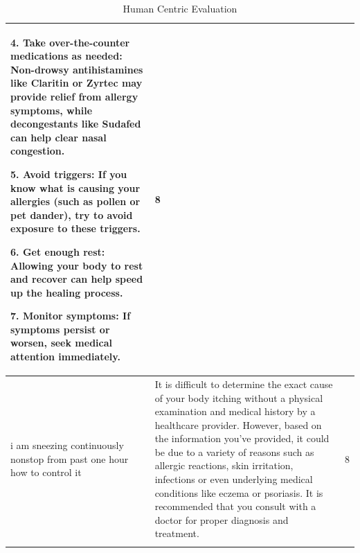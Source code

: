 \begin{longtable}{|p{3.5cm}|p{9.1cm}|c|}
                4. Take over-the-counter medications as needed: Non-drowsy antihistamines like Claritin or Zyrtec may provide relief from allergy symptoms, while decongestants like Sudafed can help clear nasal congestion.
                
                5. Avoid triggers: If you know what is causing your allergies (such as pollen or pet dander), try to avoid exposure to these triggers.
                
                6. Get enough rest: Allowing your body to rest and recover can help speed up the healing process.
                
                7. Monitor symptoms: If symptoms persist or worsen, seek medical attention immediately.
                & 8 \\ 
        \hline
         i am sneezing continuously nonstop from past one hour how to control it &  It is difficult to determine the exact cause of your body itching without a physical examination and medical history by a healthcare provider. However, based on the information you've provided, it could be due to a variety of reasons such as allergic reactions, skin irritation, infections or even underlying medical conditions like eczema or psoriasis. It is recommended that you consult with a doctor for proper diagnosis and treatment.
                & 8 \\ 
        \hline
        \caption{Human Centric Evaluation}
        \label{tab:Human Centric Evaluation}
        \end{longtable}
        
    
    

